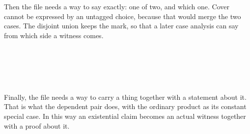 \documentclass[11pt,a4paper]{book}
\begin{document}
Then the file needs a way to say exactly: one of two, and which one. Cover
cannot be expressed by an untagged choice, because that would merge the two
cases. The disjoint union keeps the mark, so that a later case analysis can
say from which side a witness comes.

\begin{code}%
\>[0]\AgdaSpace{}%
\AgdaSpace{}%
\<%
\\
%
\\[\AgdaEmptyExtraSkip]%
\>[0]\AgdaSpace{}%
\AgdaSpace{}%
\AgdaSymbol{\{}\AgdaSpace{}%
\AgdaSymbol{:}\AgdaSpace{}%
\AgdaSymbol{\}}\AgdaSpace{}%
\AgdaSymbol{(}\AgdaSpace{}%
\AgdaSpace{}%
\AgdaSymbol{:}\AgdaSpace{}%
\AgdaSpace{}%
\AgdaSymbol{)}\AgdaSpace{}%
\AgdaSymbol{:}\AgdaSpace{}%
\AgdaSpace{}%
\AgdaSpace{}%
\<%
\\
\>[0][@{}l@{\AgdaIndent{0}}]%
\>[2]\AgdaSpace{}%
\AgdaSymbol{:}\AgdaSpace{}%
\AgdaSpace{}%
\AgdaSpace{}%
\AgdaSpace{}%
\AgdaSpace{}%
\<%
\\
%
\>[2]\AgdaSpace{}%
\AgdaSymbol{:}\AgdaSpace{}%
\AgdaSpace{}%
\AgdaSpace{}%
\AgdaSpace{}%
\AgdaSpace{}%
\<%
\end{code}

Finally, the file needs a way to carry a thing together with a statement
about it. That is what the dependent pair does, with the ordinary product
as its constant special case. In this way an existential claim becomes an
actual witness together with a proof about it.
\end{document}
